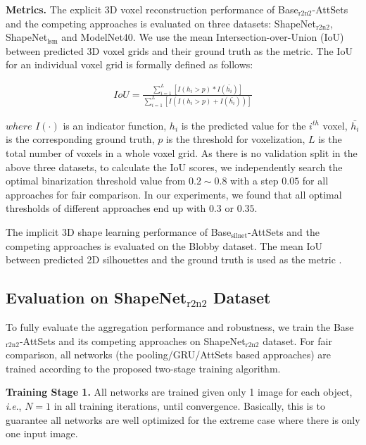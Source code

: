 \documentclass[twocolumn]{svjour3}    \pdfoutput=1
\newcommand{\nickname}{AttSets}
\newcommand{\ie}{\textit{i}.\textit{e}., }
\newcommand{\rev}{}
\begin{document}
\textbf{Metrics.} The explicit 3D voxel reconstruction performance of Base$_{\textrm{r2n2}}$-AttSets and the competing approaches is evaluated on three datasets: ShapeNet$_{\textrm{r2n2}}$, ShapeNet$_{\textrm{lsm}}$ and ModelNet40. We use the mean Intersection-over-Union (IoU) \citep{Chan2016} between predicted 3D voxel grids and their ground truth as the metric. The IoU for an individual voxel grid is formally defined as follows:
\begin{ceqn}
\begin{align*}
IoU = \frac{\sum_{i=1}^{L} \left[  I (h_i>p) * I(\bar{h_i}) \right] }{ \sum_{i=1}^{L}   \left[I  \left( I(h_{i} >p) + I(\bar{h_i}) \right) \right] } 
\end{align*}
\end{ceqn}
$where$ $I(\cdot)$ is an indicator function, $h_{i}$ is the predicted value for the $i^{th}$ voxel, $\bar{h_i}$ is the corresponding ground truth, $p$ is the threshold for voxelization, $L$ is the total number of voxels in a whole voxel grid. As there is no validation split in the above three datasets, to calculate the IoU scores, we independently search the optimal binarization threshold value from $0.2 \sim 0.8$ with a step $0.05$ for all approaches for fair comparison. In our experiments, we found that all optimal thresholds of different approaches end up with $0.3$ or $0.35$.

The implicit 3D shape learning performance of Base$_{\textrm{silnet}}$-AttSets and the competing approaches is evaluated on the Blobby dataset. The mean IoU between predicted 2D silhouettes and the ground truth is used as the metric \citep{Wiles2017}.

\subsection{Evaluation on ShapeNet$_{\textrm{r2n2}}$ Dataset}\label{sec:eval_r2n2}
To fully evaluate the aggregation performance and robustness, we train the Base$_{\textrm{r2n2}}$-AttSets and its competing approaches on ShapeNet$_{\textrm{r2n2}}$ dataset. For fair comparison, all networks \rev{(the pooling/GRU/\nickname{} based approaches)} are trained according to the proposed two-stage training algorithm.

\textbf{Training Stage 1.} All networks are trained given only 1 image for each object, \ie $N=1$ in all training iterations, until convergence. Basically, this is to guarantee all networks are well optimized for the extreme case where there is only one input image.
\end{document}
